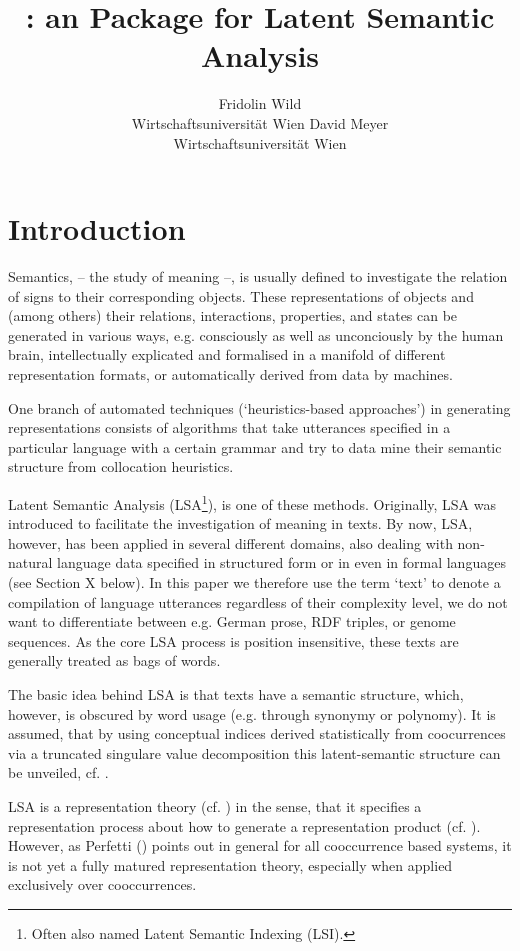\documentclass[article]{jss}
\author{Fridolin Wild\\Wirtschaftsuniversit\"at Wien \And
David Meyer\\Wirtschaftsuniversit\"at Wien}
\title{\pkg{lsa}: an \proglang{R} Package for Latent Semantic Analysis}
\begin{document}
\setcounter{equation}{0}
\renewcommand{\thefigure}{\arabic{figure}}
\renewcommand{\theequation}{\arabic{equation}}

\section[introduction]{Introduction}

Semantics, -- the study of meaning --, is usually defined to investigate 
the relation of signs to their corresponding objects. These representations
of objects and (among others) their relations, interactions, properties,
and states can be generated in various ways, e.g. consciously as well as
unconciously by the human brain, intellectually explicated and formalised
in a manifold of different representation formats, or automatically derived 
from data by machines.

One branch of automated techniques (`heuristics-based approaches') 
in generating representations consists of algorithms that take utterances 
specified in a particular language with a certain grammar and try 
to data mine their semantic structure from collocation heuristics.

Latent Semantic Analysis (LSA\footnote{Often also named Latent Semantic
Indexing (LSI).}), is one of these methods. Originally, LSA was introduced 
to facilitate the investigation of meaning in texts. By now, LSA,
however, has been applied in several different domains, also 
dealing with non-natural language data specified in structured form or
in even in formal languages (see Section X below). In this paper we
therefore use the term `text' to denote a compilation of language utterances 
regardless of their complexity level, we do not want to differentiate 
between e.g. German prose, RDF triples, or genome sequences. As the core LSA 
process is position insensitive, these texts are generally treated as bags of words.

The basic idea behind LSA is that texts have a semantic structure, which, 
however, is obscured by word usage (e.g. through synonymy or polynomy). 
It is assumed, that by using conceptual indices derived statistically from 
coocurrences via a truncated singulare value decomposition this latent-semantic 
structure can be unveiled, cf. \cite{landauer:1990}.

LSA is a representation theory (cf. \cite{kintsch:1998}) in the sense, that it 
specifies a representation process about how to generate a representation 
product (cf. \cite{scaife:1996}). However, as Perfetti (\cite{perfetti:1998}) 
points out in general for all cooccurrence based systems, it is not yet a fully
matured representation theory, especially when applied exclusively over 
cooccurrences.
\end{document}
